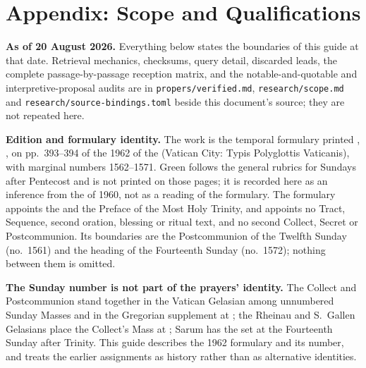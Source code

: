\sectionguard
\section*{Appendix: Scope and Qualifications}

\textbf{As of 20 August 2026.} Everything below states the boundaries of this
guide at that date. Retrieval mechanics, checksums, query detail, discarded
leads, the complete passage-by-passage reception matrix, and the
notable-and-quotable and interpretive-proposal audits are in
\texttt{propers/verified.md}, \texttt{research/scope.md} and
\texttt{research/source-bindings.toml} beside this document's source; they are
not repeated here.

\editionnote

\textbf{Edition and formulary identity.} The work is the temporal formulary
printed , ,
on pp.~393--394 of the 1962  of the  (Vatican City: Typis Polyglottis Vaticanis), with marginal numbers
1562--1571. Green follows the general rubrics for Sundays after Pentecost and
is not printed on those pages; it is recorded here as an inference from the
 of 1960, not as a reading of the formulary. The
formulary appoints the  and the Preface of the Most Holy Trinity,
and appoints no Tract, Sequence, second oration, blessing or ritual text, and
no second Collect, Secret or Postcommunion. Its boundaries are the
Postcommunion of the Twelfth Sunday (no.~1561) and the heading of the
Fourteenth Sunday (no.~1572); nothing between them is omitted.

\textbf{The Sunday number is not part of the prayers' identity.} The Collect
and Postcommunion stand together in the Vatican Gelasian among unnumbered
Sunday Masses and in the Gregorian supplement at ; the
Rheinau and S.\ Gallen Gelasians place the Collect's Mass at ; Sarum has the set at the Fourteenth Sunday after Trinity. This guide
describes the 1962 formulary and its number, and treats the earlier
assignments as history rather than as alternative identities.

